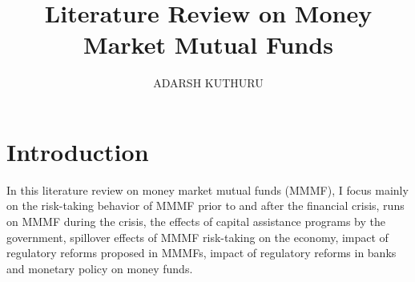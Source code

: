 \documentclass[11pt]{article}
\title{\Large \bf Literature Review on Money Market Mutual Funds}
\author{ADARSH KUTHURU}
\date{\parbox{\linewidth}{\centering%
  \today\endgraf\bigskip
  \endgraf\medskip
  PhD Student in Finance \endgraf
  Boston College, United States}}
\begin{document}
\maketitle
\thispagestyle{empty}
\bigskip
\clearpage
\tableofcontents

\onehalfspacing      %
\renewcommand{\footnote}{\endnote}  %

\clearpage




\section{Introduction} \label{sec:Intro}

In this literature review on money market mutual funds (MMMF), I focus mainly on the risk-taking behavior of MMMF prior to and after the financial crisis, runs on MMMF during the crisis, the effects of capital assistance programs by the government, spillover effects of MMMF risk-taking on the economy, impact of regulatory reforms proposed in MMMFs, impact of regulatory reforms in banks and monetary policy on money funds.
\end{document}
